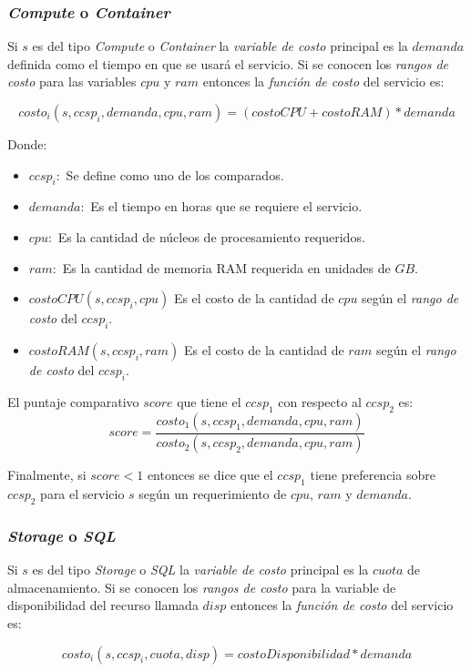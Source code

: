 \subsubsection{\emph{Compute} o \emph{Container}}
Si $s$ es del tipo \emph{Compute} o \emph{Container} la \emph{variable de costo} principal es la $demanda$ definida como el tiempo en que se usará el servicio. Si se conocen los \emph{rangos de costo} para las variables $cpu$ y $ram$ entonces la \emph{función de costo} del servicio es:

\[ costo_i(s,ccsp_i, demanda, cpu, ram) = (costoCPU +costoRAM)*demanda \]

Donde:
\begin{itemize}
    \item $ccsp_i:$ Se define como uno de los  comparados.
    \item $demanda:$ Es el tiempo en horas que se requiere el servicio.
    \item $cpu:$ Es la cantidad de núcleos de procesamiento requeridos.
    \item $ram:$ Es la cantidad de memoria RAM requerida en unidades de $GB$.
    \item $costoCPU(s,ccsp_i, cpu)$ Es el costo de la cantidad de $cpu$ según el \emph{rango de costo} del $ccsp_i$.
    \item $costoRAM(s,ccsp_i, ram)$ Es el costo de la cantidad de $ram$ según el \emph{rango de costo} del $ccsp_i$.
\end{itemize}

El puntaje comparativo $score$ que tiene el $ccsp_1$ con respecto al $ccsp_2$ es:
\[ score = \frac{costo_1(s,ccsp_1,demanda,cpu,ram)}{costo_2(s,ccsp_2,demanda,cpu,ram)} \]

Finalmente, si $score < 1$ entonces se dice que el $ccsp_1$ tiene preferencia sobre $ccsp_2$ para el servicio $s$ según un requerimiento de $cpu$, $ram$ y $demanda$.

\subsubsection{\emph{Storage} o \emph{SQL}}
Si $s$ es del tipo \emph{Storage} o \emph{SQL} la \emph{variable de costo} principal es la $cuota$ de almacenamiento. Si se conocen los \emph{rangos de costo} para la variable de disponibilidad del recurso llamada $disp$ entonces la \emph{función de costo} del servicio es:

\[ costo_i(s,ccsp_i, cuota, disp) = costoDisponibilidad*demanda \]

